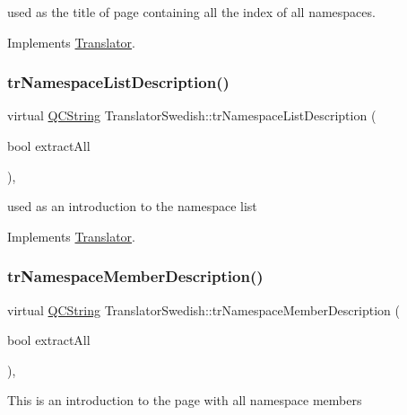 used as the title of page containing all the index of all namespaces. 

Implements \mbox{\hyperlink{class_translator}{Translator}}.

\mbox{\label{class_translator_swedish_a36328012c169e020518817fedb0bc69f}} 
\subsubsection{\texorpdfstring{trNamespaceListDescription()}{trNamespaceListDescription()}}
{\footnotesize\ttfamily virtual \mbox{\hyperlink{class_q_c_string}{Q\+C\+String}} Translator\+Swedish\+::tr\+Namespace\+List\+Description (\begin{DoxyParamCaption}\item[{bool}]{extract\+All }\end{DoxyParamCaption})\hspace{0.3cm}{\ttfamily [inline]}, {\ttfamily [virtual]}}

used as an introduction to the namespace list 

Implements \mbox{\hyperlink{class_translator}{Translator}}.

\mbox{\label{class_translator_swedish_a63267ccd49a47c4487a0d799852cd59c}} 
\subsubsection{\texorpdfstring{trNamespaceMemberDescription()}{trNamespaceMemberDescription()}}
{\footnotesize\ttfamily virtual \mbox{\hyperlink{class_q_c_string}{Q\+C\+String}} Translator\+Swedish\+::tr\+Namespace\+Member\+Description (\begin{DoxyParamCaption}\item[{bool}]{extract\+All }\end{DoxyParamCaption})\hspace{0.3cm}{\ttfamily [inline]}, {\ttfamily [virtual]}}

This is an introduction to the page with all namespace members 

